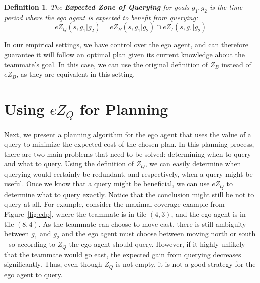 \documentclass[letterpaper]{article}
\newtheorem{definition}{Definition}
\begin{document}
\begin{definition}
The \textbf{Expected Zone of Querying}  for goals $g_1, g_2$ is the time period where the ego agent is expected to benefit from querying:
\begin{equation*}
    eZ_Q(s, g_1 | g_2) = eZ_B(s, g_1 | g_2) \cap eZ_I(s, g_1 | g_2)
\end{equation*}
\end{definition}
In our empirical settings, we have control over the ego agent, and can therefore guarantee it will follow an optimal plan given its current knowledge about the teammate's goal. In this case, we can use the original definition of $Z_B$ instead of $eZ_B$, as they are equivalent in this setting.

\section{Using $eZ_Q$ for Planning}
\label{sec:alg}
Next, we present a planning algorithm for the ego agent that uses the value of a query to minimize the expected cost of the chosen plan. In this planning process, there are two main problems that need to be solved: determining when to query and what to query. Using the definition of $Z_Q$, we can easily determine when querying would certainly be redundant, and respectively, when a query might be useful. Once we know that a query might be beneficial, we can use $eZ_Q$ to determine what to query exactly. Notice that the conclusion might still be not to query at all. For example, consider the maximal coverage example from Figure~\ref{fig:edp}, where the teammate is in tile $(4,3)$, and the ego agent is in tile $(8,4)$. As the teammate can choose to move east, there is still ambiguity between $g_1$ and $g_2$ and the ego agent must choose between moving north or south - so according to $Z_Q$ the ego agent should query. However, if it highly unlikely that the teammate would go east, the expected gain from querying decreases significantly. Thus, even though $Z_Q$ is not empty, it is not a good strategy for the ego agent to query. %
 
\end{document}
